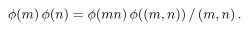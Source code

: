 \[\mathop{\phi\/}\nolimits\!\left(m\right)\mathop{\phi\/}\nolimits\!\left(n%
\right)=\mathop{\phi\/}\nolimits\!\left(mn\right)\mathop{\phi\/}\nolimits\!%
\left(\left(m,n\right)\right)/\left(m,n\right).\]